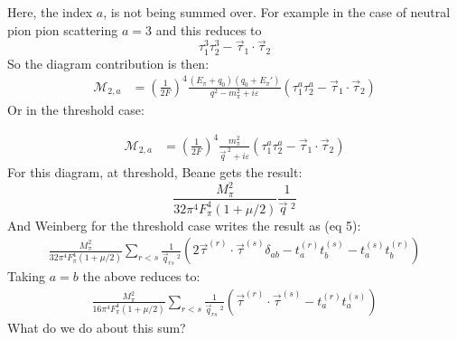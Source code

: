 \documentclass[11pt]{article}
\newcommand\ddfrac[2]{\frac{\displaystyle #1}{\displaystyle #2}}
\newcommand{\note}[1]{\color{red} #1 \color{black}}
\newcommand\mm{\mathcal{M}}
\begin{document}
Here, the index $a$, is not being summed over. For example in the case of neutral pion pion scattering $a=3$ and this reduces to
\begin{equation}
    \tau_1^3 \tau_2^3-\vec{\tau}_1 \cdot \vec{\tau}_2
\end{equation}
So the diagram contribution is then:
\begin{align}
    \mm_{2,a} &= \left( \frac{1}{2 F}  \right)^4 
    \ddfrac{(E_\pi + q_0) (q_0+E_\pi')}{q^2 - m_\pi^2+i \varepsilon} \left( \tau_1^a \tau_2^a-\vec{\tau}_1 \cdot \vec{\tau}_2 \right)
\end{align}
Or in the threshold case: 

\begin{align}
    \mm_{2,a} &= \left( \frac{1}{2 F}  \right)^4 
    \ddfrac{m_\pi^2}{\vec{q}^{\;2}+i \varepsilon} \left( \tau_1^a \tau_2^a-\vec{\tau}_1 \cdot \vec{\tau}_2 \right)
\end{align}
For this diagram, at threshold, Beane gets the result:
\begin{equation}
    \frac{M_\pi^2}{32\pi^4 F_\pi^4 (1+ \mu/2)} \frac{1}{\vec{q}\;^2} 
\end{equation}
And Weinberg for the threshold case writes the result as (eq 5):
\begin{align}
    \frac{M_\pi^2}{32\pi^4 F_\pi^4 (1+ \mu/2)}\sum_{r<s} \frac{1}{\vec{q}_{rs}\;^2}  \left( 2 \vec{\tau}^{(r)} \cdot \vec{\tau}^{(s)} \delta_{ab}-t_a^{(r)} t_b^{(s)} - t_a^{(s)} t_b^{(r)} \right)
\end{align}
Taking $a=b$ the above reduces to:
\begin{align}
    \frac{M_\pi^2}{16\pi^4 F_\pi^4 (1+ \mu/2)}\sum_{r<s} \frac{1}{\vec{q}_{rs}\;^2}  \left( \vec{\tau}^{(r)} \cdot \vec{\tau}^{(s)}-t_a^{(r)} t_a^{(s)}\right)
\end{align}
\note{What do we do about this sum?}
\end{document}
